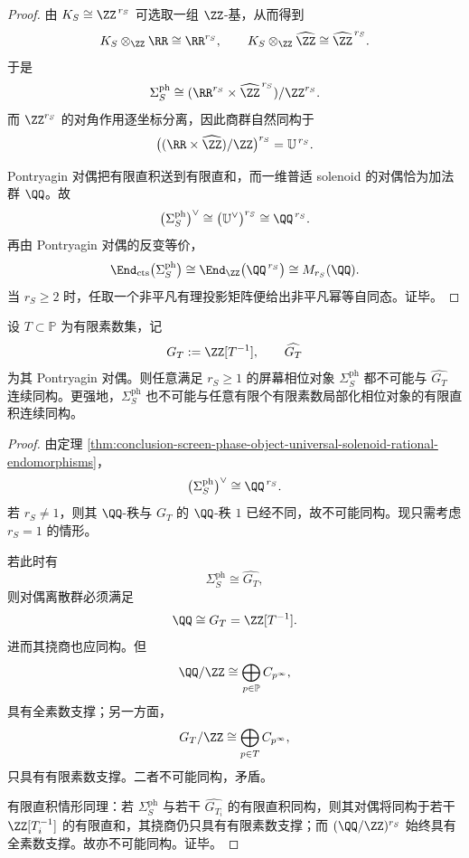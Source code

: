 \begin{proof}
由 \(K_S\cong \ZZ^{\,r_S}\) 可选取一组 \(\ZZ\)-基，从而得到
\[
K_S\otimes_{\ZZ}\RR\cong \RR^{r_S},
\qquad
K_S\otimes_{\ZZ}\widehat{\ZZ}\cong \widehat{\ZZ}^{\,r_S}.
\]
于是
\[
\Sigma_S^{\mathrm{ph}}
\cong
(\RR^{r_S}\times \widehat{\ZZ}^{\,r_S})/\ZZ^{r_S}.
\]
而 \(\ZZ^{r_S}\) 的对角作用逐坐标分离，因此商群自然同构于
\[
\bigl((\RR\times \widehat{\ZZ})/\ZZ\bigr)^{r_S}
=
\mathbb U^{\,r_S}.
\]

Pontryagin 对偶把有限直积送到有限直和，而一维普适 solenoid 的对偶恰为加法群 \(\QQ\)。故
\[
\bigl(\Sigma_S^{\mathrm{ph}}\bigr)^\vee
\cong
\bigl(\mathbb U^\vee\bigr)^{r_S}
\cong
\QQ^{\,r_S}.
\]
再由 Pontryagin 对偶的反变等价，
\[
\End_{\mathrm{cts}}\bigl(\Sigma_S^{\mathrm{ph}}\bigr)
\cong
\End_{\ZZ}\bigl(\QQ^{\,r_S}\bigr)
\cong
M_{r_S}(\QQ).
\]
当 \(r_S\ge 2\) 时，任取一个非平凡有理投影矩阵便给出非平凡幂等自同态。证毕。
\end{proof}

\begin{corollary}[非平凡屏幕相位对象不可有限素数局部化]\label{cor:conclusion-screen-phase-object-not-finitely-localizable}
设 \(T\subset \mathbb P\) 为有限素数集，记
\[
G_T:=\ZZ[T^{-1}] ,
\qquad
\widehat{G_T}
\]
为其 Pontryagin 对偶。则任意满足 \(r_S\ge 1\) 的屏幕相位对象 \(\Sigma_S^{\mathrm{ph}}\) 都不可能与 \(\widehat{G_T}\) 连续同构。更强地，\(\Sigma_S^{\mathrm{ph}}\) 也不可能与任意有限个有限素数局部化相位对象的有限直积连续同构。
\end{corollary}

\begin{proof}
由定理 \ref{thm:conclusion-screen-phase-object-universal-solenoid-rational-endomorphisms}，
\[
\bigl(\Sigma_S^{\mathrm{ph}}\bigr)^\vee\cong \QQ^{\,r_S}.
\]
若 \(r_S\neq 1\)，则其 \(\QQ\)-秩与 \(G_T\) 的 \(\QQ\)-秩 \(1\) 已经不同，故不可能同构。现只需考虑 \(r_S=1\) 的情形。

若此时有
\[
\Sigma_S^{\mathrm{ph}}\cong \widehat{G_T},
\]
则对偶离散群必须满足
\[
\QQ\cong G_T=\ZZ[T^{-1}].
\]
进而其挠商也应同构。但
\[
\QQ/\ZZ \cong \bigoplus_{p\in\mathbb P} C_{p^\infty},
\]
具有全素数支撑；另一方面，
\[
G_T/\ZZ \cong \bigoplus_{p\in T} C_{p^\infty},
\]
只具有有限素数支撑。二者不可能同构，矛盾。

有限直积情形同理：若 \(\Sigma_S^{\mathrm{ph}}\) 与若干 \(\widehat{G_{T_i}}\) 的有限直积同构，则其对偶将同构于若干 \(\ZZ[T_i^{-1}]\) 的有限直和，其挠商仍只具有有限素数支撑；而 \((\QQ/\ZZ)^{r_S}\) 始终具有全素数支撑。故亦不可能同构。证毕。
\end{proof}

\endinput
